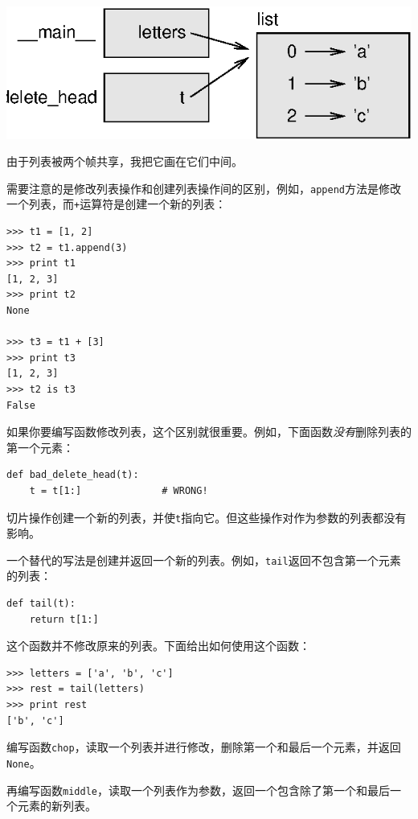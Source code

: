 
\beforefig
\centerline{\includegraphics{figs/stack5.eps}}
\afterfig

由于列表被两个帧共享，我把它画在它们中间。

需要注意的是修改列表操作和创建列表操作间的区别，例如，{\tt append}方法是修改一个列表，而{\tt +}运算符是创建一个新的列表：


\beforeverb
\begin{verbatim}
>>> t1 = [1, 2]
>>> t2 = t1.append(3)
>>> print t1
[1, 2, 3]
>>> print t2
None

>>> t3 = t1 + [3]
>>> print t3
[1, 2, 3]
>>> t2 is t3
False
\end{verbatim}
\afterverb

如果你要编写函数修改列表，这个区别就很重要。例如，下面函数{\em 没有}删除列表的第一个元素：

\beforeverb
\begin{verbatim}
def bad_delete_head(t):
    t = t[1:]              # WRONG!
\end{verbatim}
\afterverb
切片操作创建一个新的列表，并使{\tt t}指向它。但这些操作对作为参数的列表都没有影响。


一个替代的写法是创建并返回一个新的列表。例如，{\tt tail}返回不包含第一个元素的列表：

\beforeverb
\begin{verbatim}
def tail(t):
    return t[1:]
\end{verbatim}
\afterverb
%
这个函数并不修改原来的列表。下面给出如何使用这个函数：

\beforeverb
\begin{verbatim}
>>> letters = ['a', 'b', 'c']
>>> rest = tail(letters)
>>> print rest
['b', 'c']
\end{verbatim}
\afterverb


\begin{ex}

编写函数{\tt chop}，读取一个列表并进行修改，删除第一个和最后一个元素，并返回{\tt None}。

再编写函数{\tt middle}，读取一个列表作为参数，返回一个包含除了第一个和最后一个元素的新列表。

\end{ex}


